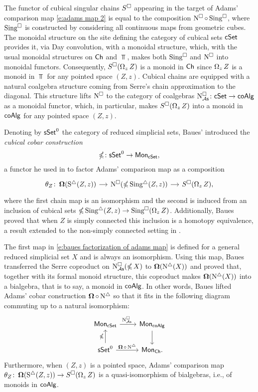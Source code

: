 The functor of cubical singular chains $S^\square$ appearing in the target of Adams' comparison map \eqref{e:adams map 2} is equal to the composition $\operatorname{N^{\square}} \circ \operatorname{Sing^{\square}}$, where $\operatorname{Sing^{\square}}$ is constructed by considering all continuous maps from geometric cubes.
The monoidal structure on the site defining the category of cubical sets $\mathsf{cSet}$ provides it, via Day convolution, with a monoidal structure, which, with the usual monoidal structures on $\mathsf{Ch}$ and $\Top$, makes both $\operatorname{Sing^{\square}}$ and $\operatorname{N^{\square}}$ into monoidal functors.
Consequently, $S^\square(\operatorname{\Omega}_z Z)$ is a monoid in $\mathsf{Ch}$ since $\operatorname{\Omega}_z Z$ is a monoid in $\Top$ for any pointed space $(Z, z)$.
Cubical chains are equipped with a natural coalgebra structure coming from Serre's chain approximation to the diagonal.
This structure lifts $\operatorname{N^{\square}}$ to the category of coalgebras $\operatorname{N^{\square}_{{\mathcal{A}\mathsf{s}}}} \colon \mathsf{cSet} \to \mathsf{coAlg}$ as a monoidal functor, which, in particular, makes $S^\square(\operatorname{\Omega}_z Z)$ into a monoid in $\mathsf{coAlg}$ for any pointed space $(Z, z)$.

Denoting by $\mathsf{sSet}^0$ the category of reduced simplicial sets, Baues' introduced the \textit{cubical cobar construction}
\[
\operatorname{\mathbb{\Omega}} \colon \mathsf{sSet}^0 \to \mathsf{Mon}_{\mathsf{cSet}},
\]
a functor he used in \cite{baues1998hopf} to factor Adams' comparison map as a composition
\begin{equation} \label{e:baues factorization of adams map}
\begin{tikzcd}[column sep = small]
\theta_Z \colon \cobar(\sS(Z, z)) \arrow[r] &
\cchains(\ccobar \sSing(Z, z)) \arrow[r] &
S^{\cube}(\loops_z Z),
\end{tikzcd}
\end{equation}
where the first chain map is an isomorphism and the second is induced from an inclusion of cubical sets $\operatorname{\mathbb{\Omega}} \operatorname{Sing^{\triangle}}(Z, z) \to \operatorname{Sing^{\square}}(\operatorname{\Omega}_z Z)$.
Additionally, Baues proved that when $Z$ is simply connected this inclusion is a homotopy equivalence, a result extended to the non-simply connected setting in \cite{rivera2019path}.

The first map in \eqref{e:baues factorization of adams map} is defined for a general reduced simplicial set $X$ and is always an isomorphism.
Using this map, Baues transferred the Serre coproduct on $\operatorname{N^{\square}_{{\mathcal{A}\mathsf{s}}}}(\operatorname{\mathbb{\Omega}} X)$ to $\operatorname{\mathbf{\Omega}}(\operatorname{N^{\triangle}}(X))$ and proved that, together with its formal monoid structure, this coproduct makes $\operatorname{\mathbf{\Omega}}(\operatorname{N^{\triangle}}(X))$ into a bialgebra, that is to say, a monoid in $\mathsf{coAlg}$.
In other words, Baues lifted Adams' cobar construction $\operatorname{\mathbf{\Omega}} \circ \operatorname{N^{\triangle}}$ so that it fits in the following diagram commuting up to a natural isomorphism:
\[
\begin{tikzcd}
\Mon_{\cSet} \arrow[r, "\cchainsAS \ "] & \Mon_{\coAlg} \arrow[d] \\
\sSet^0 \arrow[r, "\cobar \circ \schains"] \arrow[u, "\ccobar"] & \Mon_{\Ch}.
\end{tikzcd}
\]
Furthermore, when $(Z, z)$ is a pointed space, Adams' comparison map $\theta_Z \colon \operatorname{\mathbf{\Omega}}(\operatorname{S^{\triangle}}(Z, z)) \to S^{\square}(\operatorname{\Omega}_z Z)$ is a quasi-isomorphism of bialgebras, i.e., of monoids in $\mathsf{coAlg}$.

